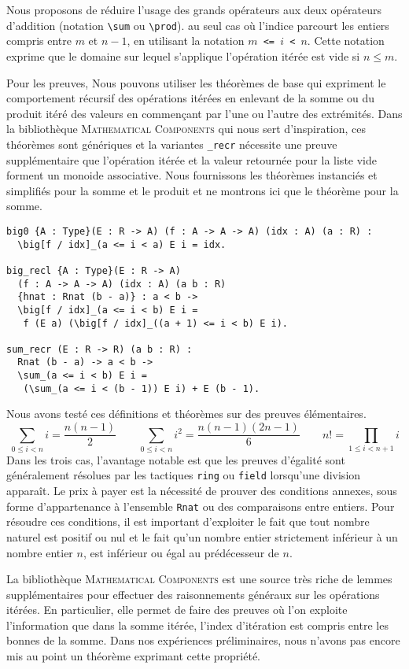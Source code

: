 \documentclass{modjflart}
\newcommand{\cmd}[1]{\texttt{\textbackslash {#1}}}
\newcommand{\mathcomp}{\textsc{Mathematical Components}}
\begin{document}
Nous proposons de réduire l'usage des grands opérateurs aux deux
opérateurs d'addition (notation \cmd{sum} ou \cmd{prod}).
au seul cas où
l'indice parcourt les entiers compris entre \({m}\) et \({n - 1}\),
en utilisant la notation \texttt{\(m\) <= \(i\) < \(n\)}.  Cette
notation exprime que le domaine sur lequel s'applique l'opération
itérée est vide si \(n \leq m\).

Pour les preuves, Nous pouvons utiliser les théorèmes de base qui
expriment le comportement récursif des opérations itérées
en enlevant de la somme ou du produit itéré des valeurs en commençant
par l'une ou l'autre des extrémités.  Dans la bibliothèque \mathcomp{}
qui nous sert d'inspiration, ces théorèmes sont génériques et la
variantes \texttt{\_recr} nécessite une preuve supplémentaire que
l'opération itérée et la valeur retournée pour la liste vide forment
 un monoide associative.  Nous fournissons les théorèmes
 instanciés et simplifiés pour la somme et le produit et ne montrons
 ici que le théorème pour la somme.
\begin{verbatim}
big0 {A : Type}(E : R -> A) (f : A -> A -> A) (idx : A) (a : R) :
  \big[f / idx]_(a <= i < a) E i = idx.

big_recl {A : Type}(E : R -> A)
  (f : A -> A -> A) (idx : A) (a b : R)
  {hnat : Rnat (b - a)} : a < b ->
  \big[f / idx]_(a <= i < b) E i =
   f (E a) (\big[f / idx]_((a + 1) <= i < b) E i).

sum_recr (E : R -> R) (a b : R) :
  Rnat (b - a) -> a < b ->
  \sum_(a <= i < b) E i =
   (\sum_(a <= i < (b - 1)) E i) + E (b - 1).
\end{verbatim}

Nous avons testé ces définitions et théorèmes sur des preuves élémentaires.
\[\sum_{0 \leq i < n} i = \frac{n (n - 1)}{2} \qquad
\sum_{0 \leq i < n} i ^2 = \frac{n (n - 1) (2 n - 1)}{6} \qquad
n! = \prod_{1 \leq i < n + 1} i\]
Dans les trois cas, l'avantage notable est que les preuves d'égalité
sont généralement résolues par les tactiques \texttt{ring} ou \texttt{field}
lorsqu'une division apparaît.  Le prix à payer est la nécessité de
prouver des conditions annexes, sous forme d'appartenance à l'ensemble
\texttt{Rnat} ou des comparaisons entre entiers.  Pour résoudre ces
conditions, il est important d'exploiter le fait que tout nombre
naturel est positif ou nul et le fait qu'un nombre entier
strictement inférieur à un nombre entier \(n\), est inférieur ou égal au
prédécesseur de \(n\).

La bibliothèque \mathcomp{} est une source très riche de lemmes
supplémentaires pour effectuer des raisonnements généraux sur les
opérations itérées.  En particulier, elle permet de faire des preuves
où l'on exploite l'information que dans la somme itérée, l'index
d'itération est compris entre les bonnes de la somme.  Dans nos
expériences préliminaires, nous n'avons pas encore mis au point un
théorème exprimant cette propriété.
\end{document}
